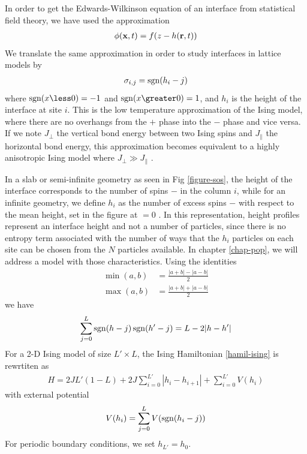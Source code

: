 {\color{red} 
In order to get the Edwards-Wilkinson equation of an interface from statistical field theory, we have used the approximation 
\begin{align}
\phi({\bf x},t) = f(z-h({\bf r},t))
\end{align}
We translate the same approximation in order to study interfaces in lattice models by
\begin{align}
\sigma_{i,j} = \operatorname{sgn}(h_i-j)
\label{approx-sos}
\end{align}
where $\sgn(x \less 0) = -1$ and $\sgn(x \greater 0) = 1$, and $h_i$ is the height of the interface at site $i$. 
This is the low temperature approximation of the Ising model, where there are no overhangs from the $+$ phase into the $-$ phase and vice versa. If we note $J_\perp$ the vertical bond energy between two Ising spins and $J_\parallel$ the horizontal bond energy, this approximation becomes equivalent to a highly anisotropic Ising model where $J_\perp \gg J_\parallel$ \cite{swendsen_roughening_1977}.

In a slab or semi-infinite geometry as seen in Fig \ref{figure-sos}, the height of the interface corresponds to the number of spins $-$ in the column $i$, while for an infinite geometry, we define $h_i$ as the number of excess spins $-$ with respect to the mean height, set in the figure at $=0$ \cite{van_leeuwen_pinning_1981}. In this representation, height profiles represent an interface height and not a number of particles, since there is no entropy term associated with the number of ways that the $h_i$ particles on each site can be chosen from the $N$ particles available. In chapter \ref{chap-pop}, we will address a model with those characteristics.
Using the identities
\begin{align}
\min(a,b) &= \frac{|a+b| - |a-b|}{2} \\
\max(a,b) &= \frac{|a+b| + |a-b|}{2}
\end{align}
we have
\begin{align}
\sum_{j=0}^L \operatorname{sgn}(h-j)\operatorname{sgn}(h'-j) = L - 2 |h-h'|
\end{align}
For a 2-D Ising model of size $L'\times L$, the Ising Hamiltonian \eqref{hamil-ising} is rewrtiten as
\begin{align}
H = 2 J L' (1-L) +2 J \sum_{i=0}^{L'} |h_i-h_{i+1}| + \sum_{i=0}^{L'} V(h_i)
\label{energie-sos-ising}
\end{align}
with external potential 
\begin{align}
V(h_i) = \sum_{j=0}^L V(\operatorname{sgn}(h_i-j))
\end{align}
For periodic boundary conditions, we set $h_{L'}=h_0$.

}
